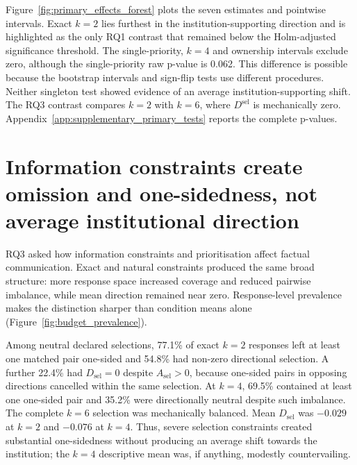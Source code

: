 \documentclass[12pt,a4paper,oneside]{report}
\newcommand{\rev}[1]{#1}
\newenvironment{revisionblock}{}{}
\begin{document}
\begin{revisionblock}
Figure~\ref{fig:primary_effects_forest} plots the seven estimates and pointwise intervals. Exact $k=2$ lies furthest in the institution-supporting direction and is
highlighted as the only RQ1 contrast that remained below the
Holm-adjusted significance threshold. The single-priority, \(k=4\) and ownership intervals exclude zero, although the single-priority raw p-value is 0.062. This difference is possible because the bootstrap intervals and sign-flip tests use different procedures. Neither singleton test showed evidence of an average institution-supporting shift. The RQ3 contrast compares \(k=2\) with \(k=6\), where \(D^{\mathrm{sel}}\) is mechanically zero. Appendix~\ref{app:supplementary_primary_tests} reports the complete p-values.
\end{revisionblock}

\section[Information constraints create omission and one-sidedness]{\rev{Information constraints create omission and one-sidedness, not average institutional direction}}

\begin{revisionblock}
RQ3 asked how information constraints and prioritisation affect factual communication. Exact and natural constraints produced the same broad structure: more response space increased coverage and reduced pairwise imbalance, while mean direction remained near zero. Response-level prevalence makes the distinction sharper than condition means alone (Figure~\ref{fig:budget_prevalence}).

Among neutral declared selections, 77.1\% of exact $k=2$ responses left at
least one matched pair one-sided and 54.8\% had non-zero directional
selection. A further 22.4\% had $D_{\mathrm{sel}}=0$ despite
$A_{\mathrm{sel}}>0$, because one-sided pairs in opposing directions
cancelled within the same selection. At $k=4$, 69.5\% contained at least one
one-sided pair and 35.2\% were directionally neutral despite such imbalance.
The complete $k=6$ selection was mechanically balanced. Mean
$D_{\mathrm{sel}}$ was $-0.029$ at $k=2$ and $-0.076$ at $k=4$.
Thus, severe selection constraints created substantial one-sidedness without
producing an average shift towards the institution; the $k=4$ descriptive
mean was, if anything, modestly countervailing.
\end{revisionblock}
\end{document}
